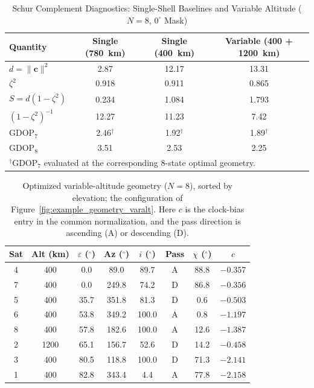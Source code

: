 \documentclass[letterpaper,times]{IONconf-v2}
\theoremstyle{plain}
\theoremstyle{remark}
\begin{document}
\begin{table}[htb]
\caption{Schur Complement Diagnostics: Single-Shell Baselines and Variable Altitude ($N = 8$, $0^\circ$ Mask)}
\label{tab:example_results}
\centering
\footnotesize
\begin{tabular}{lccc}
\toprule
Quantity & Single (780~km) & Single (400~km) & Variable (400 + 1200~km) \\
\hline
$d = \|\mathbf{c}\|^2$            & 2.87             & 12.17            & 13.31 \\
$\zeta^2$                          & 0.918            & 0.911            & 0.865 \\
$S = d(1-\zeta^2)$                 & 0.234            & 1.084            & 1.793 \\
$(1-\zeta^2)^{-1}$                 & 12.27            & 11.23            & 7.42  \\
$\mathrm{GDOP}_7$                 & 2.46$^{\dagger}$ & 1.92$^{\dagger}$ & 1.89$^{\dagger}$ \\
$\mathrm{GDOP}_8$                 & 3.51             & 2.53             & 2.25  \\
\bottomrule
\multicolumn{4}{l}{\footnotesize $^\dagger$$\mathrm{GDOP}_7$ evaluated at the corresponding 8-state optimal geometry.}
\end{tabular}
\vspace{-10pt} 
\end{table}

\begin{table}[htb]
\caption{Optimized variable-altitude geometry ($N = 8$), sorted by elevation; the configuration of Figure~\ref{fig:example_geometry_varalt}. Here $c$ is the clock-bias entry in the common normalization, and the pass direction is ascending (A) or descending (D).}
\label{tab:example_config}
\centering
\footnotesize
\setlength{\tabcolsep}{4pt}
\begin{tabular}{cccccccc}
\toprule
Sat & Alt (km) & $\varepsilon$ ($^\circ$) & Az ($^\circ$) & $i$ ($^\circ$) & Pass & $\chi$ ($^\circ$) & $c$ \\
\midrule
4 &  400 &  0.0 &  89.0 &  89.7 & A & 88.8 & $-0.357$ \\
7 &  400 &  0.0 & 249.8 &  74.2 & D & 86.8 & $-0.356$ \\
5 &  400 & 35.7 & 351.8 &  81.3 & D &  0.6 & $-0.503$ \\
6 &  400 & 53.8 & 349.2 & 100.0 & A &  0.8 & $-1.197$ \\
8 &  400 & 57.8 & 182.6 & 100.0 & A & 12.6 & $-1.387$ \\
2 & 1200 & 65.1 & 156.7 &  52.6 & D & 14.2 & $-0.458$ \\
3 &  400 & 80.5 & 118.8 & 100.0 & D & 71.3 & $-2.141$ \\
1 &  400 & 82.8 & 343.4 &   4.4 & A & 77.8 & $-2.158$ \\
\bottomrule
\end{tabular}
\vspace{-10pt} 
\end{table}
\end{document}
